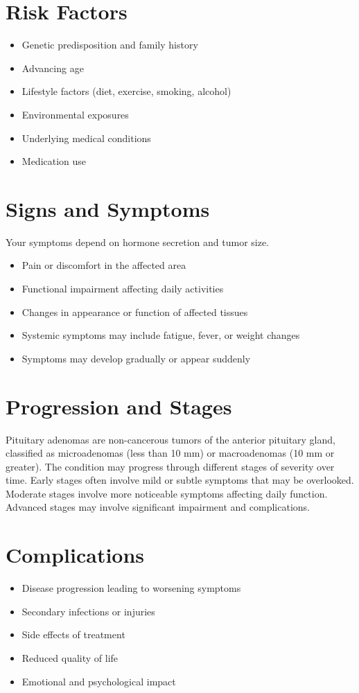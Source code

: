 \section{Risk Factors}
\begin{itemize}[noitemsep]
  \item Genetic predisposition and family history
  \item Advancing age
  \item Lifestyle factors (diet, exercise, smoking, alcohol)
  \item Environmental exposures
  \item Underlying medical conditions
  \item Medication use
\end{itemize}
\section{Signs and Symptoms}
Your symptoms depend on hormone secretion and tumor size.

\begin{itemize}[noitemsep]
  \item Pain or discomfort in the affected area
  \item Functional impairment affecting daily activities
  \item Changes in appearance or function of affected tissues
  \item Systemic symptoms may include fatigue, fever, or weight changes
  \item Symptoms may develop gradually or appear suddenly
\end{itemize}
\section{Progression and Stages}
Pituitary adenomas are non-cancerous tumors of the anterior pituitary gland, classified as microadenomas (less than 10 mm) or macroadenomas (10 mm or greater). The condition may progress through different stages of severity over time. Early stages often involve mild or subtle symptoms that may be overlooked. Moderate stages involve more noticeable symptoms affecting daily function. Advanced stages may involve significant impairment and complications.
\section{Complications}
\begin{itemize}[noitemsep]
  \item Disease progression leading to worsening symptoms
  \item Secondary infections or injuries
  \item Side effects of treatment
  \item Reduced quality of life
  \item Emotional and psychological impact
\end{itemize}
